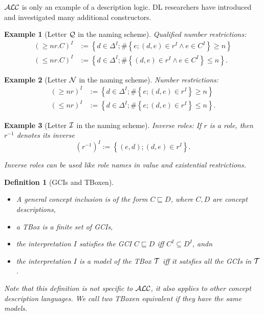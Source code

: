 \documentclass[openany]{scrbook}
\theoremstyle{break}
\newtheorem{Definition}[Theorem]{Definition}
\theoremstyle{nonumberbreak}
\newtheorem{Example}{Example}
\theoremstyle{nonumberplain}
\theoremstyle{nonumberbreak}
\newcommand{\set}[1]{\left\{#1\right\}}
\newcommand{\ALC}{{\cal A}{\cal L}{\cal C}}
\begin{document}
$\ALC$ is only an example of a description logic. DL researchers have
introduced and investigated many additional constructors.

\begin{Example}[Letter ${\cal Q}$ in the naming scheme]
  Qualified number restrictions:
  \begin{align*}
    (\geq n r.C)^I & := \set{d \in \Delta^I; \#\set{e; (d, e) \in r^I
        \wedge e \in C^I} \geq n} \\
    (\leq n r.C)^I & := \set{d \in \Delta^I; \#\set{(d, e) \in r^I
        \wedge e \in C^I} \leq n}.
  \end{align*}
\end{Example}

\begin{Example}[Letter ${\cal N}$ in the naming scheme]
  Number restrictions:
  \begin{align*}
    (\geq n r)^I & := \set{d \in \Delta^I; \#\set{e; (d, e) \in r^I}
      \geq n} \\
    (\leq n r)^I & := \set{d \in \Delta^I; \#\set{e; (d, e) \in r^I}
      \leq n}.
  \end{align*}
\end{Example}

\begin{Example}[Letter ${\cal I}$ in the naming scheme]
  Inverse roles: If $r$ is a role, then $r^{-1}$ denotes its inverse
  \begin{equation*}
    (r^{-1})^I := \set{(e, d); (d, e) \in r^I}.
  \end{equation*}

  Inverse roles can be used like role names in value and existential
  restrictions.
\end{Example}

\begin{Definition}[GCIs and TBoxen]
  \label{2.4}
  \begin{itemize}
  \item A general concept inclusion is of the form $C \sqsubseteq D$,
    where $C, D$ are concept descriptions,
  \item a TBox is a finite set of GCIs,
  \item the interpretation $I$ satisfies the GCI $C \sqsubseteq D$ iff
    $C^I \subseteq D^I$, andn
  \item the interpretation $I$ is a model of the TBox ${\cal T}$ iff
    it satsfies all the GCIs in ${\cal T}$.
  \end{itemize}

  Note that this definition is not specific to $\ALC$, it also applies
  to other concept description languages. We call two TBoxen
  equivalent if they have the same models.
\end{Definition}
\end{document}
